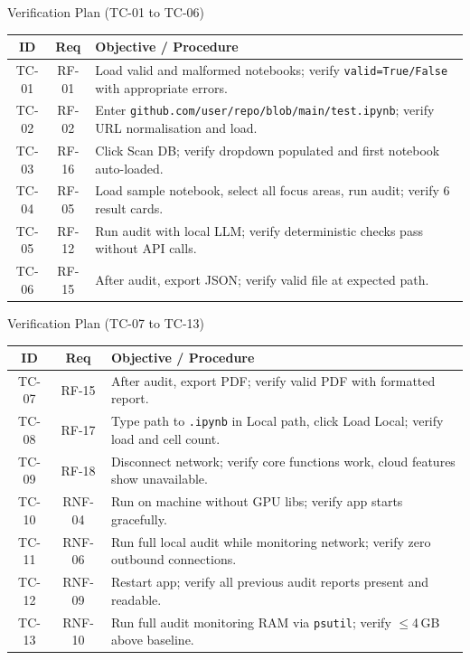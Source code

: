 \documentclass[aspectratio=169,11pt]{beamer}
\begin{document}
\begin{frame}[shrink]{Verification Plan (TC-01 to TC-06)}
  \centering
  \scriptsize
  \renewcommand{\arraystretch}{0.8}
  \begin{tabularx}{\textwidth}{c c X}
    \toprule
    \textbf{ID} & \textbf{Req} & \textbf{Objective / Procedure} \\
    \midrule
    TC-01 & RF-01 & Load valid and malformed notebooks; verify \texttt{valid=True/False} with appropriate errors. \\
    TC-02 & RF-02 & Enter \texttt{github.com/user/repo/blob/main/test.ipynb}; verify URL normalisation and load. \\
    TC-03 & RF-16 & Click Scan DB; verify dropdown populated and first notebook auto-loaded. \\
    TC-04 & RF-05 & Load sample notebook, select all focus areas, run audit; verify 6 result cards. \\
    TC-05 & RF-12 & Run audit with local LLM; verify deterministic checks pass without API calls. \\
    TC-06 & RF-15 & After audit, export JSON; verify valid file at expected path. \\
    \bottomrule
  \end{tabularx}
\end{frame}

\begin{frame}[shrink]{Verification Plan (TC-07 to TC-13)}
  \centering
  \scriptsize
  \renewcommand{\arraystretch}{0.8}
  \begin{tabularx}{\textwidth}{c c X}
    \toprule
    \textbf{ID} & \textbf{Req} & \textbf{Objective / Procedure} \\
    \midrule
    TC-07 & RF-15 & After audit, export PDF; verify valid PDF with formatted report. \\
    TC-08 & RF-17 & Type path to \texttt{.ipynb} in Local path, click Load Local; verify load and cell count. \\
    TC-09 & RF-18 & Disconnect network; verify core functions work, cloud features show unavailable. \\
    TC-10 & RNF-04 & Run on machine without GPU libs; verify app starts gracefully. \\
    TC-11 & RNF-06 & Run full local audit while monitoring network; verify zero outbound connections. \\
    TC-12 & RNF-09 & Restart app; verify all previous audit reports present and readable. \\
    TC-13 & RNF-10 & Run full audit monitoring RAM via \texttt{psutil}; verify $\leq$4\,GB above baseline. \\
    \bottomrule
  \end{tabularx}
\end{frame}
\end{document}
